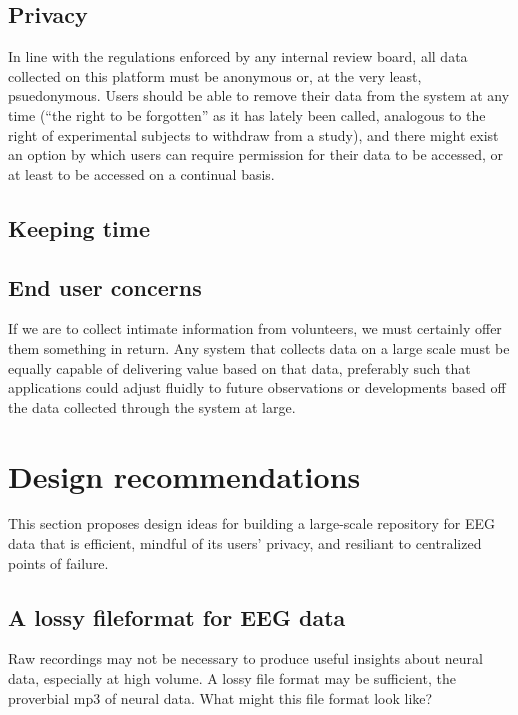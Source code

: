\documentclass[a4paper,twoside]{article}
\begin{document}
\subsection{Privacy}

In line with the regulations enforced by any internal review board, all data collected on this platform must be anonymous or, at the very least, psuedonymous. Users should be able to remove their data from the system at any time (``the right to be forgotten'' as it has lately been called, analogous to the right of experimental subjects to withdraw from a study), and there might exist an option by which users can require permission for their data to be accessed, or at least to be accessed on a continual basis.

\subsection{Keeping time}

\subsection{End user concerns}

If we are to collect intimate information from volunteers, we must certainly offer them something in return. Any system that collects data on a large scale must be equally capable of delivering value based on that data, preferably such that applications could adjust fluidly to future observations or developments based off the data collected through the system at large. 






\section{Design recommendations}

This section proposes design ideas for building a large-scale repository for EEG data that is efficient, mindful of its users' privacy, and resiliant to centralized points of failure.

\subsection{A lossy fileformat for EEG data}
Raw recordings may not be necessary to produce useful insights about neural data, especially at high volume. A lossy file format may be sufficient, the proverbial mp3 of neural data. What might this file format look like?
\end{document}
